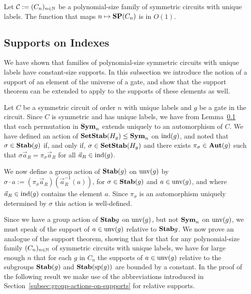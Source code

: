 \documentclass[../paper.tex]{subfiles}
\begin{document}
\begin{cor}
  Let $\mathcal{C} := (C_n)_{n \in \mathbb{N}}$ be a polynomial-size family of
  symmetric circuits with unique labels. The function that maps $n \mapsto
  \text{\textbf{SP}}(C_n) $ is in $O(1)$.
  \label{cor:constant-size-support}
\end{cor}



\subsection{Supports on Indexes}
We have shown that families of polynomial-size symmetric circuits with unique
labels have constant-size supports. In this subsection we introduce the notion
of a support of an element of the universe of a gate, and show that the support
theorem can be extended to apply to the supports of these elements as well.

Let $C$ be a symmetric circuit of order $n$ with unique labels and $g$ be a gate
in the circuit. Since $C$ is symmetric and has unique labels, we have from
Lemma~\ref{} that each permutation in $\text{\textbf{Sym}}_n$ extends uniquely to an
automorphism of $C$. We have defined an action of $\text{\textbf{SetStab}}(H_g) \leq \text{\textbf{Sym}}_n$ on
$\text{\upshape ind}(g)$, and noted that $\sigma \in \text{\textbf{Stab}}(g)$ if, and only if, $\sigma \in
\text{\textbf{SetStab}}(H_g)$ and there exists $\pi_{\sigma} \in \text{\textbf{Aut}}(g)$ such that $\sigma
\vec{a}_R = \pi_{\sigma} \vec{a}_R$ for all $\vec{a}_R \in \text{\upshape ind}(g)$.

We now define a group action of $\text{\textbf{Stab}}(g)$ on $\text{unv}(g)$ by $\sigma \cdot a
:= (\pi_{\sigma}\vec{a}_R) (\vec{a}^{-1}_R(a))$, for $\sigma \in \text{\textbf{Stab}}(g)$ and
$a \in \text{unv}(g)$, and where $\vec{a}_R \in \text{\upshape ind}(g)$ contains the element
$a$. Since $\pi_{\sigma}$ is an automorphism uniquely determined by $\sigma$
this action is well-defined.

Since we have a group action of $\text{\textbf{Stab}}{g}$ on $\text{unv}(g)$, but not $\text{\textbf{Sym}}_n$
on $\text{unv}(g)$, we must speak of the support of $a \in \text{unv}(g)$ relative
to $\text{\textbf{Stab}}{g}$. We now prove an analogue of the support theorem, showing that for
that for any polynomial-size family $(C_n)_{n \in \mathbb{N}}$ of symmetric circuits
with unique labels, we have for large enough $n$ that for each $g$ in $C_n$ the
supports of $a \in \text{unv}(g)$ relative to the subgroups $\text{\textbf{Stab}}(g)$ and
$\text{\textbf{Stab}} (\text{sp} (g))$ are bounded by a constant. In the proof of the following result we
make use of the abbreviations introduced in Section~\ref{subsec:group-actions-on-supports} for relative supports.
\end{document}
